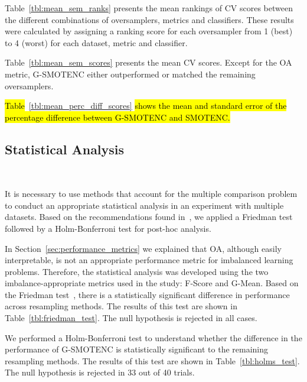 \documentclass[preprint,12pt]{elsarticle}
\begin{document}
{Table~\ref{tbl:mean_sem_ranks} presents the mean rankings of CV scores between
the different combinations of oversamplers, metrics and classifiers. These
results were calculated by assigning a ranking score for each oversampler from
1 (best) to 4 (worst) for each dataset, metric and classifier.



Table~\ref{tbl:mean_sem_scores} presents the mean CV scores. Except for the
OA metric, G-SMOTENC either outperformed or matched the remaining
oversamplers.



\hl{Table}~\ref{tbl:mean_perc_diff_scores}\hl{ shows the mean and standard
error of the percentage difference between G-SMOTENC and SMOTENC.}



\subsection{Statistical Analysis}~\label{sec:statistical_analysis}

It is necessary to use methods that account for the multiple comparison
problem to conduct an appropriate statistical analysis in an experiment with
multiple datasets. Based on the recommendations found in~\cite{Demsar2006}, we
applied a Friedman test followed by a Holm-Bonferroni test for post-hoc
analysis.

In Section~\ref{sec:performance_metrics} we explained that OA, although easily
interpretable, is not an appropriate performance metric for imbalanced
learning problems. Therefore, the statistical analysis was developed using the
two imbalance-appropriate metrics used in the study: F-Score and G-Mean. Based
on the Friedman test~\cite{friedman1937use}, there is a statistically
significant difference in performance across resampling methods. The results
of this test are shown in Table~\ref{tbl:friedman_test}. The null hypothesis
is rejected in all cases.



We performed a Holm-Bonferroni test to understand whether the difference in
the performance of G-SMOTENC is statistically significant to the remaining
resampling methods. The results of this test are shown in
Table~\ref{tbl:holms_test}. The null hypothesis is rejected in 33 out of 40
trials.



}
\end{document}
